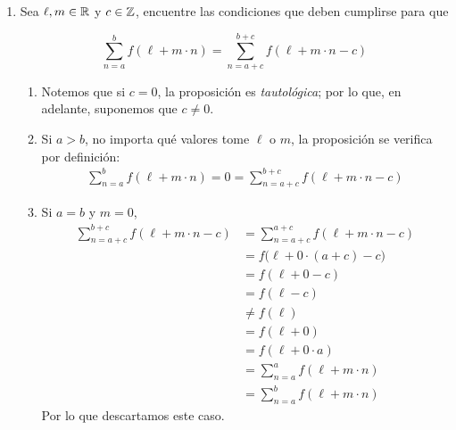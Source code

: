 \begin{enumerate}[label=\alph*)]
\begin{enumerate}[label=\Roman*)]
   \[\sum_{n=a}^{b}f(n) = \sum_{n=0}^{b} f(n) - \sum_{n=0}^{a-1} f(n)\]
  \begin{proof}\leavevmode
    \begin{align*}
      \sum_{n=0}^{b} f(n) - \sum_{n=0}^{a-1} f(n) &= \sum_{n=0}^{a} f(n) + \sum_{a+1}^{b} f(n) - \sum_{n=0}^{a-1}f(n) && \text{Separar la suma}\\
      &= \sum_{n=0}^{a-1} f(n) + \sum_{n=a}^{a} f(n) + \sum_{a+1}^{b} f(n) - \sum_{n=0}^{a-1}f(n) && \text{Separar la suma}\\
      &= \sum_{n=a}^{a} f(n) + \sum_{a+1}^{b} f(n)\\
      &= \sum_{n=a}^{b}f(n)
    \end{align*}
  \end{proof}

  \end{enumerate}
  
  \item Sea $\ell, m\in \mathbb{R}$ y $c\in \mathbb{Z}$, encuentre las condiciones que deben cumplirse para que
  
  \[\sum_{n=a}^b f(\ell+m\cdot n) = \sum_{n=a+c}^{b+c} f(\ell+m\cdot n-c)\]

  \begin{enumerate}[label=\Roman*)]
    \item Notemos que si $c=0$, la proposición es \textit{tautológica}; por lo que, en adelante, suponemos que $c\neq 0$.
    \item Si $a>b$, no importa qué valores tome $\ell$ o $m$, la proposición se verifica por definición:
    \begin{align*}
      \sum_{n=a}^b f(\ell+m\cdot n) = 0 = \sum_{n=a+c}^{b+c} f(\ell+m\cdot n-c)
    \end{align*}
    \item Si $a=b$ y $m=0$,
    \begin{align*}
      \sum_{n=a+c}^{b+c} f(\ell+m\cdot n-c) &= \sum_{n=a+c}^{a+c} f(\ell+m\cdot n-c)\\
      &= f\bigl(\ell+0\cdot (a+c)-c\bigr)\\
      &=f(\ell+0-c)\\
      &= f(\ell-c)\\
      &\neq f(\ell)\\
      &= f(\ell+0)\\
      &= f(\ell+0\cdot a)\\
      &= \sum_{n=a}^a f(\ell+m\cdot n)\\
      &= \sum_{n=a}^b f(\ell+m\cdot n)
    \end{align*}
    Por lo que descartamos este caso.


\end{enumerate}
\end{enumerate}
